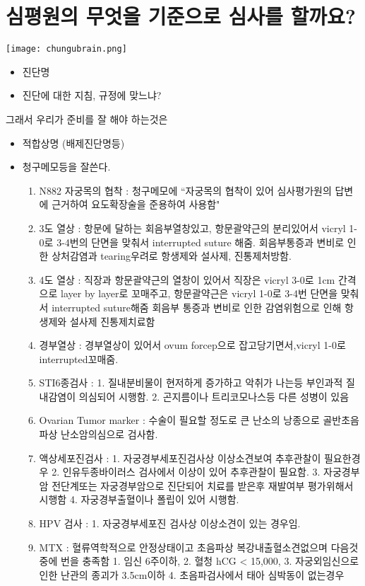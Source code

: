 \section{심평원의 무엇을 기준으로 심사를 할까요?}
\begin{center}
\texttt{[image: chungubrain.png]}
\end{center}

\begin{itemize}
\item 진단명
\item 진단에 대한 지침, 규정에 맞느냐? 
\end{itemize}
그래서 우리가 준비를 잘 해야 하는것은

\begin{itemize}
\item 적합상명 (배제진단명등)
\item 청구메모등을 잘쓴다.
	\begin{enumerate}\tightlist
	\item N882  자궁목의 협착 : 청구메모에 ``자궁목의 협착이 있어 심사평가원의 답변에 근거하여 요도확장술을 준용하여 사용함"
	\item 3도 열상 : 항문에 달하는 회음부열창있고, 항문괄약근의 분리있어서 vicryl 1-0로 3-4번의 단면을 맞춰서 interrupted suture  해줌.
회음부통증과 변비로 인한 상처감염과 tearing우려로 항생제와 설사제, 진통제처방함.
	\item 4도 열상 : 직장과 항문괄약근의 열창이 있어서 직장은 vicryl 3-0로 1cm 간격으로 layer by layer로 꼬매주고, 항문괄약근은 vicryl 1-0로 3-4번 단면을 맞춰서 interrupted suture해줌
회음부 통증과 변비로 인한 감염위험으로 인해 항생제와 설사제 진통제치료함
	\item 경부열상 : 경부열상이 있어서 ovum forcep으로 잡고당기면서,vicryl 1-0로  interrupted꼬매줌.
	\item STI6종검사 : 1. 질내분비물이 현저하게 증가하고 악취가 나는등 부인과적 질내감염이 의심되어 시행함.
2. 곤지름이나 트리코모나스등 다른 성병이 있음
	\item Ovarian Tumor marker : 수술이 필요할 정도로 큰 난소의 낭종으로 골반초음파상 난소암의심으로 검사함.
	\item 액상세포진검사 : 1. 자궁경부세포진검사상 이상소견보여 추후관찰이 필요한경우
2. 인유두종바이러스 검사에서 이상이 있어 추후관찰이 필요함.
3. 자궁경부암 전단계또는 자궁경부암으로 진단되어 치료를 받은후 재발여부 평가위해서 시행함
4. 자궁경부출혈이나 폴립이 있어 시행함.
	\item HPV 검사 : 1.  자궁경부세포진 검사상 이상소견이 있는 경우임.
	\item MTX : 혈류역학적으로 안정상태이고 초음파상 복강내출혈소견없으며 다음것중에 번을 충족함
1. 임신 6주이하, 2. 혈청  hCG < 15,000, 3. 자궁외임신으로인한 난관의 종괴가 3.5cm이하 4. 초음파검사에서 태아 심박동이 없는경우
	\end{enumerate}
\end{itemize}

